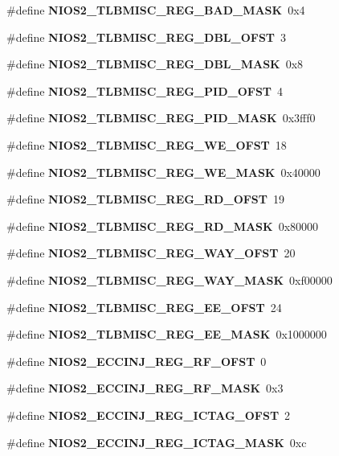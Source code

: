 \begin{DoxyCompactItemize}
\item 
\#define {\bf N\+I\+O\+S2\+\_\+\+T\+L\+B\+M\+I\+S\+C\+\_\+\+R\+E\+G\+\_\+\+B\+A\+D\+\_\+\+M\+A\+SK}~0x4
\item 
\#define {\bf N\+I\+O\+S2\+\_\+\+T\+L\+B\+M\+I\+S\+C\+\_\+\+R\+E\+G\+\_\+\+D\+B\+L\+\_\+\+O\+F\+ST}~3
\item 
\#define {\bf N\+I\+O\+S2\+\_\+\+T\+L\+B\+M\+I\+S\+C\+\_\+\+R\+E\+G\+\_\+\+D\+B\+L\+\_\+\+M\+A\+SK}~0x8
\item 
\#define {\bf N\+I\+O\+S2\+\_\+\+T\+L\+B\+M\+I\+S\+C\+\_\+\+R\+E\+G\+\_\+\+P\+I\+D\+\_\+\+O\+F\+ST}~4
\item 
\#define {\bf N\+I\+O\+S2\+\_\+\+T\+L\+B\+M\+I\+S\+C\+\_\+\+R\+E\+G\+\_\+\+P\+I\+D\+\_\+\+M\+A\+SK}~0x3fff0
\item 
\#define {\bf N\+I\+O\+S2\+\_\+\+T\+L\+B\+M\+I\+S\+C\+\_\+\+R\+E\+G\+\_\+\+W\+E\+\_\+\+O\+F\+ST}~18
\item 
\#define {\bf N\+I\+O\+S2\+\_\+\+T\+L\+B\+M\+I\+S\+C\+\_\+\+R\+E\+G\+\_\+\+W\+E\+\_\+\+M\+A\+SK}~0x40000
\item 
\#define {\bf N\+I\+O\+S2\+\_\+\+T\+L\+B\+M\+I\+S\+C\+\_\+\+R\+E\+G\+\_\+\+R\+D\+\_\+\+O\+F\+ST}~19
\item 
\#define {\bf N\+I\+O\+S2\+\_\+\+T\+L\+B\+M\+I\+S\+C\+\_\+\+R\+E\+G\+\_\+\+R\+D\+\_\+\+M\+A\+SK}~0x80000
\item 
\#define {\bf N\+I\+O\+S2\+\_\+\+T\+L\+B\+M\+I\+S\+C\+\_\+\+R\+E\+G\+\_\+\+W\+A\+Y\+\_\+\+O\+F\+ST}~20
\item 
\#define {\bf N\+I\+O\+S2\+\_\+\+T\+L\+B\+M\+I\+S\+C\+\_\+\+R\+E\+G\+\_\+\+W\+A\+Y\+\_\+\+M\+A\+SK}~0xf00000
\item 
\#define {\bf N\+I\+O\+S2\+\_\+\+T\+L\+B\+M\+I\+S\+C\+\_\+\+R\+E\+G\+\_\+\+E\+E\+\_\+\+O\+F\+ST}~24
\item 
\#define {\bf N\+I\+O\+S2\+\_\+\+T\+L\+B\+M\+I\+S\+C\+\_\+\+R\+E\+G\+\_\+\+E\+E\+\_\+\+M\+A\+SK}~0x1000000
\item 
\#define {\bf N\+I\+O\+S2\+\_\+\+E\+C\+C\+I\+N\+J\+\_\+\+R\+E\+G\+\_\+\+R\+F\+\_\+\+O\+F\+ST}~0
\item 
\#define {\bf N\+I\+O\+S2\+\_\+\+E\+C\+C\+I\+N\+J\+\_\+\+R\+E\+G\+\_\+\+R\+F\+\_\+\+M\+A\+SK}~0x3
\item 
\#define {\bf N\+I\+O\+S2\+\_\+\+E\+C\+C\+I\+N\+J\+\_\+\+R\+E\+G\+\_\+\+I\+C\+T\+A\+G\+\_\+\+O\+F\+ST}~2
\item 
\#define {\bf N\+I\+O\+S2\+\_\+\+E\+C\+C\+I\+N\+J\+\_\+\+R\+E\+G\+\_\+\+I\+C\+T\+A\+G\+\_\+\+M\+A\+SK}~0xc
\item 

\end{DoxyCompactItemize}
